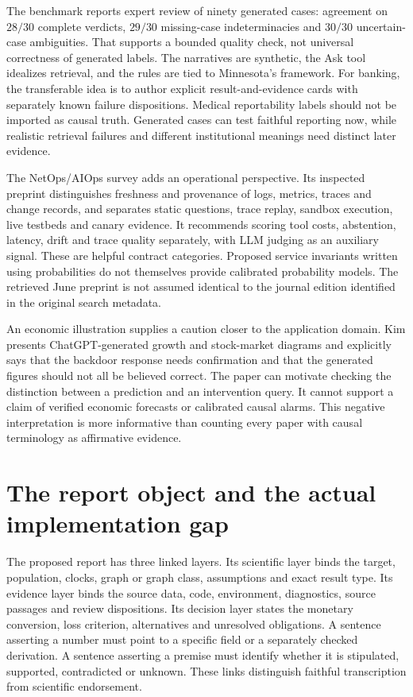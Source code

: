 The benchmark reports expert review of ninety generated cases: agreement on
\(28/30\) complete verdicts, \(29/30\) missing-case indeterminacies and
\(30/30\) uncertain-case ambiguities. That supports a bounded quality check,
not universal correctness of generated labels. The narratives are synthetic,
the Ask tool idealizes retrieval, and the rules are tied to Minnesota's
framework. For banking, the transferable idea is to author explicit
result-and-evidence cards with separately known failure dispositions.
Medical reportability labels should not be imported as causal truth.
Generated cases can test faithful reporting now, while realistic retrieval
failures and different institutional meanings need distinct later evidence.

The NetOps/AIOps survey adds an operational perspective. Its inspected preprint
distinguishes freshness and provenance of logs, metrics, traces and change
records, and separates static questions, trace replay, sandbox execution, live
testbeds and canary evidence. It recommends scoring tool costs, abstention,
latency, drift and trace quality separately, with LLM judging as an auxiliary
signal. These are helpful contract categories. Proposed service invariants
written using probabilities do not themselves provide calibrated probability
models. The retrieved June preprint is not assumed identical to the journal
edition identified in the original search metadata.
\citep{exec16_report_netops}

An economic illustration supplies a caution closer to the application domain.
Kim presents ChatGPT-generated growth and stock-market diagrams and explicitly
says that the backdoor response needs confirmation and that the generated
figures should not all be believed correct. The paper can motivate checking the
distinction between a prediction and an intervention query. It cannot support
a claim of verified economic forecasts or calibrated causal alarms. This
negative interpretation is more informative than counting every paper with
causal terminology as affirmative evidence.
\citep{exec16_report_kimeconomy}

\section{The report object and the actual implementation gap}

The proposed report has three linked layers. Its scientific layer binds the
target, population, clocks, graph or graph class, assumptions and exact result
type. Its evidence layer binds the source data, code, environment, diagnostics,
source passages and review dispositions. Its decision layer states the monetary
conversion, loss criterion, alternatives and unresolved obligations. A sentence
asserting a number must point to a specific field or a separately checked
derivation. A sentence asserting a premise must identify whether it is
stipulated, supported, contradicted or unknown. These links distinguish faithful
transcription from scientific endorsement.
\citep{exec16_report_contract}

